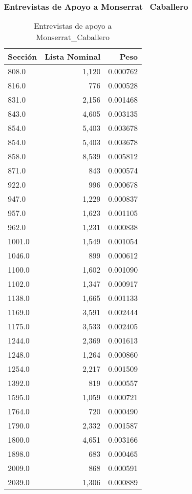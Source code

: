 \documentclass[a4paper,12pt]{article}
\begin{document}
\subsubsection*{Entrevistas de Apoyo a Monserrat_Caballero}
\begin{table}[h]
\centering
\begin{tabular}{lrr}
\toprule
Sección & Lista Nominal & Peso \\ \midrule
808.0 & 1,120 & 0.000762 \\ 
816.0 & 776 & 0.000528 \\ 
831.0 & 2,156 & 0.001468 \\ 
843.0 & 4,605 & 0.003135 \\ 
854.0 & 5,403 & 0.003678 \\ 
854.0 & 5,403 & 0.003678 \\ 
858.0 & 8,539 & 0.005812 \\ 
871.0 & 843 & 0.000574 \\ 
922.0 & 996 & 0.000678 \\ 
947.0 & 1,229 & 0.000837 \\ 
957.0 & 1,623 & 0.001105 \\ 
962.0 & 1,231 & 0.000838 \\ 
1001.0 & 1,549 & 0.001054 \\ 
1046.0 & 899 & 0.000612 \\ 
1100.0 & 1,602 & 0.001090 \\ 
1102.0 & 1,347 & 0.000917 \\ 
1138.0 & 1,665 & 0.001133 \\ 
1169.0 & 3,591 & 0.002444 \\ 
1175.0 & 3,533 & 0.002405 \\ 
1244.0 & 2,369 & 0.001613 \\ 
1248.0 & 1,264 & 0.000860 \\ 
1254.0 & 2,217 & 0.001509 \\ 
1392.0 & 819 & 0.000557 \\ 
1595.0 & 1,059 & 0.000721 \\ 
1764.0 & 720 & 0.000490 \\ 
1790.0 & 2,332 & 0.001587 \\ 
1800.0 & 4,651 & 0.003166 \\ 
1898.0 & 683 & 0.000465 \\ 
2009.0 & 868 & 0.000591 \\ 
2039.0 & 1,306 & 0.000889 \\ 
\bottomrule
\end{tabular}
\caption{Entrevistas de apoyo a Monserrat_Caballero}
\end{table}
\end{document}
